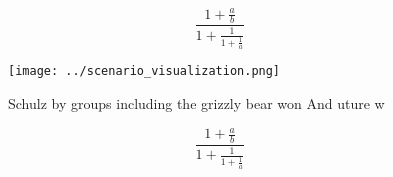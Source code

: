 \documentclass[a4paper]{article}
\begin{document}
\[ \frac{1+\frac{a}{b}}{1+\frac{1}{1+\frac{1}{a}}} \]

\begin{figure}
\centering
\texttt{[image: ../scenario\_visualization.png]}
\caption{Schulz by groups including the grizzly bear won And uture w
}
\end{figure}
 
\[ \frac{1+\frac{a}{b}}{1+\frac{1}{1+\frac{1}{a}}} \]
\end{document}
